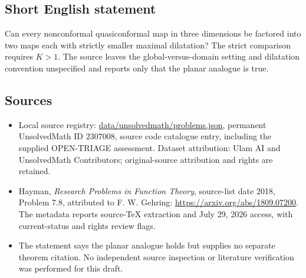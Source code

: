 \documentclass[11pt]{article}
\begin{document}
\subsection{Short English statement}
Can every nonconformal quasiconformal map in three dimensions be factored into two maps each with strictly smaller maximal dilatation? The strict comparison requires $K>1$. The source leaves the global-versus-domain setting and dilatation convention unspecified and reports only that the planar analogue is true.
\subsection{Sources}
\begin{itemize}
\item Local source registry: \url{data/unsolvedmath/problems.json}, permanent UnsolvedMath ID $2307008$, source code catalogue entry, including the supplied OPEN-TRIAGE assessment. Dataset attribution: Ulam AI and UnsolvedMath Contributors; original-source attribution and rights are retained.
\item Hayman, \emph{Research Problems in Function Theory}, source-list date 2018, Problem 7.8, attributed to F. W. Gehring: \url{https://arxiv.org/abs/1809.07200}. The metadata reports source-TeX extraction and July 29, 2026 access, with current-status and rights review flags.
\item The statement says the planar analogue holds but supplies no separate theorem citation. No independent source inspection or literature verification was performed for this draft.
\end{itemize}
\end{document}
